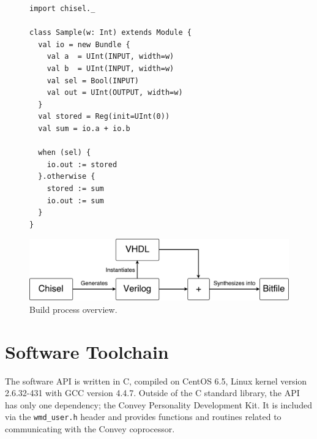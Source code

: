 \begin{figure}
\begin{mintedsubfloat}{0.5\linewidth}
\begin{verbatim}
import chisel._

class Sample(w: Int) extends Module {
  val io = new Bundle {
    val a  = UInt(INPUT, width=w)
    val b  = UInt(INPUT, width=w)
    val sel = Bool(INPUT)
    val out = UInt(OUTPUT, width=w)
  }
  val stored = Reg(init=UInt(0))
  val sum = io.a + io.b

  when (sel) {
    io.out := stored
  }.otherwise {
    stored := sum
    io.out := sum
  }
} 
\end{verbatim} 
\end{mintedsubfloat}
\end{figure}

\begin{figure}[ht]
  \centering
  \includegraphics[width=0.8\linewidth]{fig/hardware-build-process}
  \caption{Build process overview.\label{fig:hw-build-process} }
\end{figure}

\section{Software Toolchain}
\label{sec:sw-toolchain}

The software API is written in C, compiled on CentOS 6.5, Linux kernel version
2.6.32-431 with GCC version 4.4.7. Outside of the C standard library, the API
has only one dependency; the Convey Personality Development Kit. It is included
via the \texttt{wmd\_user.h} header and provides functions and routines related
to communicating with the Convey coprocessor.


\cleardoublepage
